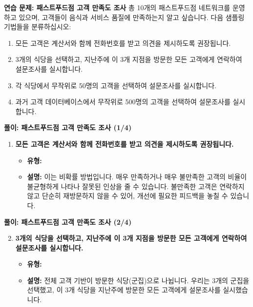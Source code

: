\documentclass[11pt,a4paper]{article}
\theoremstyle{definition}
\begin{document}
\begin{practicebox}
\textbf{연습 문제: 패스트푸드점 고객 만족도 조사}
총 10개의 패스트푸드점 네트워크를 운영하고 있으며, 고객들이 음식과 서비스 품질에 만족하는지 알고 싶습니다. 다음 샘플링 기법들을 분류하십시오:
\begin{enumerate}
    \item 모든 고객은 계산서와 함께 전화번호를 받고 의견을 제시하도록 권장됩니다.
    \item 3개의 식당을 선택하고, 지난주에 이 3개 지점을 방문한 모든 고객에게 연락하여 설문조사를 실시합니다.
    \item 각 식당에서 무작위로 50명의 고객을 선택하여 설문조사를 실시합니다.
    \item 과거 고객 데이터베이스에서 무작위로 500명의 고객을 선택하여 설문조사를 실시합니다.
\end{enumerate}
\end{practicebox}

\begin{solutionbox}
\textbf{풀이: 패스트푸드점 고객 만족도 조사 (1/4)}
\begin{enumerate}
    \item \textbf{모든 고객은 계산서와 함께 전화번호를 받고 의견을 제시하도록 권장됩니다.}
    \begin{itemize}
        \item \textbf{유형:} 
        \item \textbf{설명:} 이는 비확률 방법입니다. 매우 만족하거나 매우 불만족한 고객의 비율이 불균형하게 나타나 잘못된 인상을 줄 수 있습니다. 불만족한 고객은 연락하지 않고 단순히 재방문하지 않을 수 있어, 개선에 필요한 피드백을 놓칠 수 있습니다.
    \end{itemize}
\end{enumerate}
\end{solutionbox}

\begin{solutionbox}
\textbf{풀이: 패스트푸드점 고객 만족도 조사 (2/4)}
\begin{enumerate}
    \setcounter{enumi}{1}
    \item \textbf{3개의 식당을 선택하고, 지난주에 이 3개 지점을 방문한 모든 고객에게 연락하여 설문조사를 실시합니다.}
    \begin{itemize}
        \item \textbf{유형:} 
        \item \textbf{설명:} 전체 고객 기반이 방문한 식당(군집)으로 나뉩니다. 우리는 3개의 군집을 선택했고, 이 3개 식당을 지난주에 방문한 모든 고객에게 설문조사를 실시했습니다.
    \end{itemize}
\end{enumerate}
\end{solutionbox}
\end{document}
